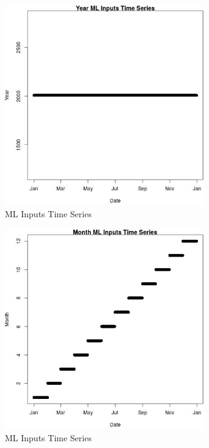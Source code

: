 \begin{figure} 
\centering  
\includegraphics[width=0.77\textwidth]{Code_Outputs/Report_ML_input_PM25_Step4_part_e_de_duplicated_aves_YearvDate.jpg} 
\caption{\label{fig:Report_ML_input_PM25_Step4_part_e_de_duplicated_avesYearvDate}ML Inputs Time Series} 
\end{figure} 
 

\begin{figure} 
\centering  
\includegraphics[width=0.77\textwidth]{Code_Outputs/Report_ML_input_PM25_Step4_part_e_de_duplicated_aves_MonthvDate.jpg} 
\caption{\label{fig:Report_ML_input_PM25_Step4_part_e_de_duplicated_avesMonthvDate}ML Inputs Time Series} 
\end{figure} 
 

